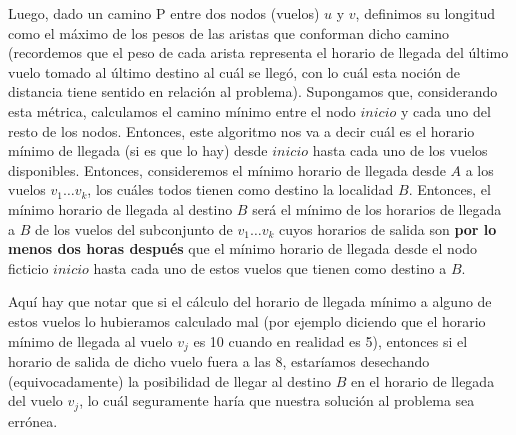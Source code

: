 \documentclass[11pt, a4paper, twoside]{article}
\begin{document}
\par Luego, dado un camino P entre dos nodos (vuelos) $u$ y $v$, definimos su longitud como
el máximo de los pesos de las aristas que conforman dicho camino (recordemos que el peso de cada
arista representa el horario de llegada del último vuelo tomado al último destino al cuál se
llegó, con lo cuál esta noción de distancia tiene sentido en relación al problema). 
Supongamos que, considerando 
esta métrica, calculamos el camino mínimo entre el nodo $inicio$ y cada uno del resto de los nodos.
Entonces, este algoritmo nos va a decir cuál es el horario mínimo de llegada (si es que lo hay) 
desde $inicio$ hasta cada uno de los vuelos disponibles. Entonces, consideremos el mínimo
horario de llegada desde $A$ a los vuelos $v_{1} \dots v_{k}$, los cuáles todos tienen como destino la 
localidad $B$. Entonces, el mínimo horario de llegada al destino $B$ será el mínimo de los horarios
de llegada a $B$ de los vuelos del subconjunto de $v_{1} \dots v_{k}$ cuyos horarios de salida son 
\textbf{por lo menos dos horas después} que el mínimo horario de llegada desde el nodo ficticio
$inicio$ hasta cada uno de estos vuelos que tienen como destino a $B$.

\par Aquí hay que notar que si el cálculo del horario de llegada mínimo a
alguno de estos vuelos lo hubieramos calculado mal (por ejemplo diciendo que el horario mínimo de
llegada al vuelo $v_{j}$ es 10 cuando en realidad es 5), entonces si el horario de salida de dicho vuelo
fuera a las 8, estaríamos desechando (equivocadamente) la posibilidad de llegar al destino $B$ en el 
horario de llegada del vuelo $v_{j}$, lo cuál seguramente haría que nuestra solución al problema
sea errónea.
\end{document}
